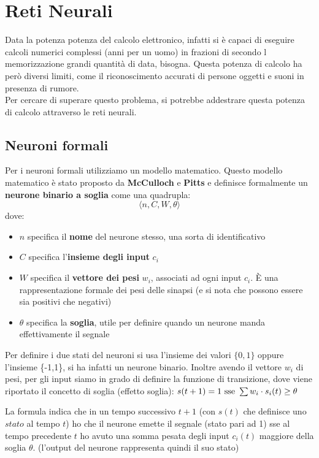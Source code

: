 \section{Reti Neurali}
Data la potenza potenza del calcolo elettronico, infatti si è capaci di eseguire calcoli numerici complessi (anni per un uomo) in frazioni di secondo l memorizzazione grandi quantità di data, bisogna. Questa potenza di calcolo ha però diversi limiti, come il riconoscimento accurati di persone oggetti e suoni in presenza di rumore.  \\
Per cercare di superare questo problema, si potrebbe addestrare questa potenza di calcolo attraverso le reti neurali. 

\subsection{Neuroni formali}
Per i neuroni formali utilizziamo un modello matematico. Questo modello matematico è stato proposto da \textbf{McCulloch} e \textbf{Pitts} e definisce formalmente un \textbf{neurone binario a soglia} come una quadrupla: \[\langle n, C, W, \theta \rangle\] dove: 
\begin{itemize} 
    \item $n$ specifica il \textbf{nome} del neurone stesso, una sorta di identificativo \item $C$ specifica l'\textbf{insieme degli input} $c_i$ 
    \item $W$ specifica il \textbf{vettore dei pesi} $w_i$, associati ad ogni input $c_i$. È una rappresentazione formale dei pesi delle sinapsi (e si nota che possono essere sia positivi che negativi) 
    \item $\theta$ specifica la \textbf{soglia}, utile per definire quando un neurone manda effettivamente il segnale
\end{itemize}

Per definire i due stati del neuroni si usa l'insieme dei valori $\{0,1\}$ oppure l'insieme \{-1,1\}, si ha infatti un neurone binario. Inoltre avendo il vettore $w_i$ di pesi, per gli input
siamo in grado di definire la funzione di transizione, dove viene riportato il concetto di soglia (effetto soglia): 
$s(t+1)=1 \mbox{ \textnormal{sse} }\sum w_i\cdot s_i(t)\geq \theta$

La formula indica che in un tempo successivo $t+1$ (con $s(t)$ che definisce uno $stato$ al tempo $t$) ho che il neurone emette il segnale (stato pari ad 1) sse al tempo precedente $t$ ho avuto una somma pesata degli input $c_i(t)$ maggiore della soglia $\theta$. (l'output del neurone rappresenta quindi il suo stato)\\ 

